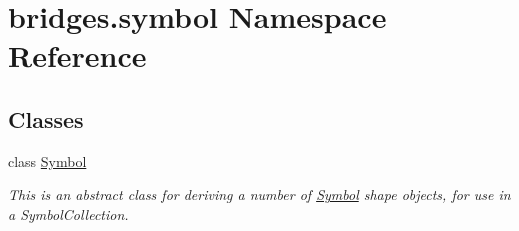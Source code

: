 \hypertarget{namespacebridges_1_1symbol}{}\section{bridges.\+symbol Namespace Reference}
\label{namespacebridges_1_1symbol}
\subsection*{Classes}
\begin{DoxyCompactItemize}
\item 
class \mbox{\hyperlink{classbridges_1_1symbol_1_1_symbol}{Symbol}}
\begin{DoxyCompactList}\small\item\em This is an abstract class for deriving a number of \mbox{\hyperlink{classbridges_1_1symbol_1_1_symbol}{Symbol}} shape objects, for use in a Symbol\+Collection. \end{DoxyCompactList}\end{DoxyCompactItemize}
